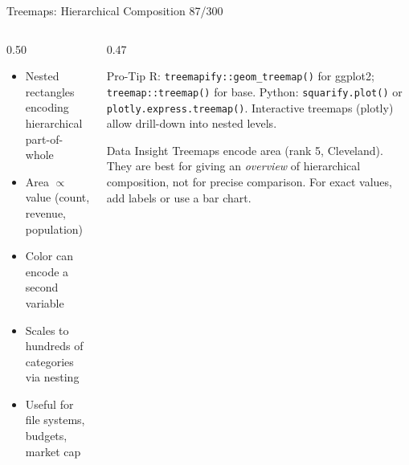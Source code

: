 \documentclass[10pt]{beamer}
\newcommand{\smark}[1]{\hfill{\scriptsize\color{codegray}#1}}
\begin{document}
\begin{frame}{Treemaps: Hierarchical Composition}
\smark{87/300}
\begin{columns}[T]
\begin{column}{0.50\textwidth}
\begin{itemize}
    \item Nested rectangles encoding hierarchical part-of-whole
    \item Area $\propto$ value (count, revenue, population)
    \item Color can encode a second variable
    \item Scales to hundreds of categories via nesting
    \item Useful for file systems, budgets, market cap
\end{itemize}
\end{column}
\begin{column}{0.47\textwidth}
\begin{alertblock}{Pro-Tip}
    \scriptsize R: \texttt{treemapify::geom\_treemap()} for ggplot2; \texttt{treemap::treemap()} for base. Python: \texttt{squarify.plot()} or \texttt{plotly.express.treemap()}. Interactive treemaps (plotly) allow drill-down into nested levels.
\end{alertblock}
\vspace{0.1cm}
\begin{exampleblock}{Data Insight}
    \scriptsize Treemaps encode area (rank 5, Cleveland). They are best for giving an \emph{overview} of hierarchical composition, not for precise comparison. For exact values, add labels or use a bar chart.
\end{exampleblock}
\end{column}
\end{columns}
\end{frame}
\end{document}
